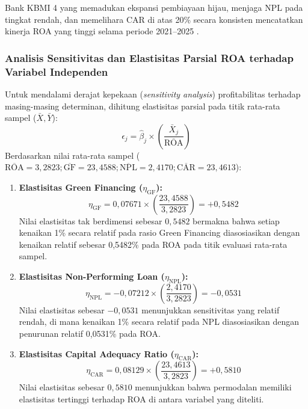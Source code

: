 \documentclass[12pt,a4paper]{article}
\numberwithin{equation}{section}
\begin{document}
\noindent
Bank KBMI 4 yang memadukan ekspansi pembiayaan hijau, menjaga NPL pada tingkat rendah, dan memelihara CAR di atas 20\% secara konsisten mencatatkan kinerja ROA yang tinggi selama periode 2021--2025 \citep{WulandariRahardjo2022, Chiaramonte2020}.

\subsubsection{Analisis Sensitivitas dan Elastisitas Parsial ROA terhadap Variabel Independen}
\noindent
Untuk mendalami derajat kepekaan (\emph{sensitivity analysis}) profitabilitas terhadap masing-masing determinan, dihitung elastisitas parsial pada titik rata-rata sampel ($\bar{X}, \bar{Y}$):
\begin{equation}
  \epsilon_j = \hat{\beta}_j \times \left( \frac{\bar{X}_j}{\overline{\text{ROA}}} \right)
\end{equation}
Berdasarkan nilai rata-rata sampel ($\overline{\text{ROA}} = 3{,}2823; \overline{\text{GF}} = 23{,}4588; \overline{\text{NPL}} = 2{,}4170; \overline{\text{CAR}} = 23{,}4613$):
\begin{enumerate}
  \item \textbf{Elastisitas Green Financing ($\eta_{\text{GF}}$):}
    \begin{equation}
      \eta_{\text{GF}} = 0{,}07671 \times \left( \frac{23{,}4588}{3{,}2823} \right) = +0{,}5482
    \end{equation}
    Nilai elastisitas tak berdimensi sebesar $0{,}5482$ bermakna bahwa setiap kenaikan 1\% secara relatif pada rasio Green Financing diasosiasikan dengan kenaikan relatif sebesar 0,5482\% pada ROA pada titik evaluasi rata-rata sampel.
  \item \textbf{Elastisitas Non-Performing Loan ($\eta_{\text{NPL}}$):}
    \begin{equation}
      \eta_{\text{NPL}} = -0{,}07212 \times \left( \frac{2{,}4170}{3{,}2823} \right) = -0{,}0531
    \end{equation}
    Nilai elastisitas sebesar $-0{,}0531$ menunjukkan sensitivitas yang relatif rendah, di mana kenaikan 1\% secara relatif pada NPL diasosiasikan dengan penurunan relatif 0,0531\% pada ROA.
  \item \textbf{Elastisitas Capital Adequacy Ratio ($\eta_{\text{CAR}}$):}
    \begin{equation}
      \eta_{\text{CAR}} = 0{,}08129 \times \left( \frac{23{,}4613}{3{,}2823} \right) = +0{,}5810
    \end{equation}
    Nilai elastisitas sebesar $0{,}5810$ menunjukkan bahwa permodalan memiliki elastisitas tertinggi terhadap ROA di antara variabel yang diteliti.
\end{enumerate}
\end{document}
